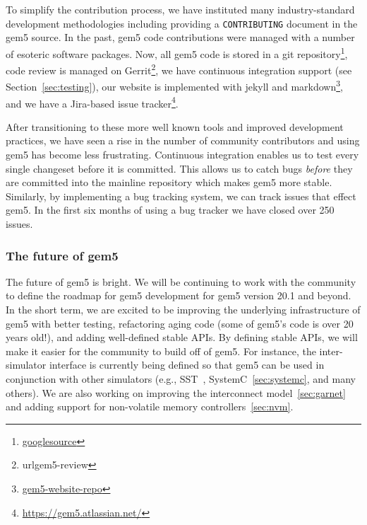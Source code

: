 To simplify the contribution process, we have instituted many industry-standard development methodologies including providing a \verb|CONTRIBUTING| document in the gem5 source.
In the past, gem5 code contributions were managed with a number of esoteric software packages.
Now, all gem5 code is stored in a git repository\footnote{\url{googlesource}}, code review is managed on Gerrit\footnote{url{gem5-review}}, we have continuous integration support (see Section~\ref{sec:testing}), our website is implemented with jekyll and markdown\footnote{\url{gem5-website-repo}}, and we have a Jira-based issue tracker\footnote{\url{https://gem5.atlassian.net/}}.

After transitioning to these more well known tools and improved development practices, we have seen a rise in the number of community contributors and using gem5 has become less frustrating.
Continuous integration enables us to test every single changeset before it is committed.
This allows us to catch bugs \emph{before} they are committed into the mainline repository which makes gem5 more stable.
Similarly, by implementing a bug tracking system, we can track issues that effect gem5.
In the first six months of using a bug tracker we have closed over 250 issues.

\subsubsection*{The future of gem5}
The future of gem5 is bright.
We will be continuing to work with the community to define the roadmap for gem5 development for gem5 version 20.1 and beyond.
In the short term, we are excited to be improving the underlying infrastructure of gem5 with better testing, refactoring aging code (some of gem5's code is over 20 years old!), and adding well-defined stable APIs.
By defining stable APIs, we will make it easier for the community to build off of gem5.
For instance, the inter-simulator interface is currently being defined so that gem5 can be used in conjunction with other simulators (e.g., SST~\cite{}, SystemC~\ref{sec:systemc}, and many others).
We are also working on improving the interconnect model~\ref{sec:garnet} and adding support for non-volatile memory controllers~\ref{sec:nvm}.

